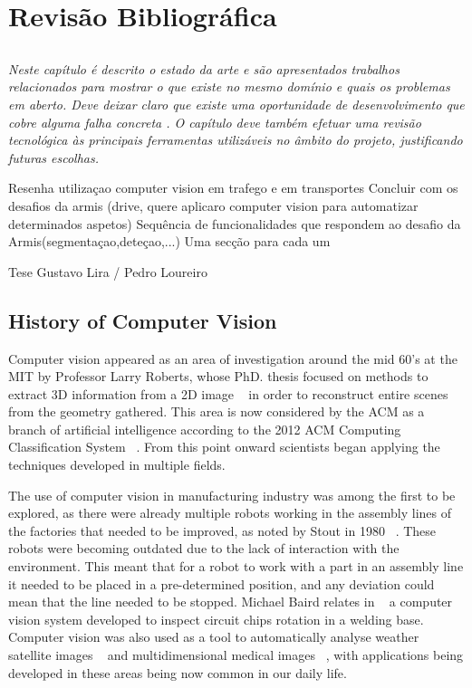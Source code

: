 
\chapter{Revisão Bibliográfica} \label{chap:sota}

\section*{}
\textit{
Neste capítulo é descrito o estado da arte e são
apresentados trabalhos relacionados para mostrar o que existe no
mesmo domínio e quais os problemas em aberto.
Deve deixar claro que existe uma oportunidade de desenvolvimento que
cobre alguma falha concreta .
O capítulo deve também efetuar uma revisão tecnológica às principais
ferramentas utilizáveis no âmbito do projeto, justificando futuras
escolhas.
}

Resenha utilizaçao computer vision em trafego e em transportes
Concluir com os desafios da armis (drive, quere aplicaro computer vision para automatizar determinados aspetos)
Sequência de funcionalidades que respondem ao desafio da Armis(segmentaçao,deteçao,...)
Uma secção para cada um

Tese Gustavo Lira / Pedro Loureiro

\section{History of Computer Vision}

Computer vision appeared as an area of investigation around the mid 60's at the MIT by Professor Larry Roberts, whose PhD. thesis focused on methods to extract 3D information from a 2D image ~\cite{huang_computer_1996} in order to reconstruct entire scenes from the geometry gathered. This area is now considered by the ACM as a branch of artificial intelligence according to the 2012 ACM Computing Classification System ~\cite{acm_2012_2012}. From this point onward scientists began applying the techniques developed in multiple fields.

The use of computer vision in manufacturing industry was among the first to be explored, as there were already multiple robots working in the assembly lines of the factories that needed to be improved, as noted by Stout in 1980 ~\cite{stout_computer_1980}. These robots were becoming outdated due to the lack of interaction with the environment. This meant that for a robot to work with a part in an assembly line it needed to be placed in a pre-determined position, and any deviation could mean that the line needed to be stopped. Michael Baird relates in ~\cite{l._baird_sight-i:_1978} a computer vision system developed to inspect circuit chips rotation in a welding base. Computer vision was also used as a tool to automatically analyse weather satellite images ~\cite{binford_computer_1973-2} and multidimensional medical images ~\cite{ayache_medical_1998}, with applications being developed in these areas being now common in our daily life.

